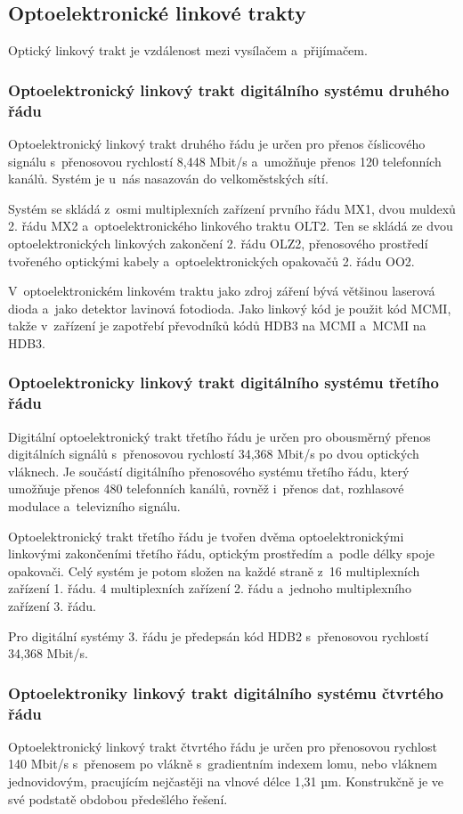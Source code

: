 \subsection{Optoelektronické linkové trakty}
Optický linkový trakt je vzdálenost mezi vysílačem a~přijímačem.

\subsubsection{Optoelektronický linkový trakt digitálního systému druhého řádu}
Optoelektronický linkový trakt druhého řádu je určen pro přenos číslicového signálu s~přenosovou rychlostí 8,448 Mbit/s a~umožňuje přenos 120 telefonních kanálů. Systém je u~nás nasazován do velkoměstských sítí.

Systém se skládá z~osmi multiplexních zařízení prvního řádu MX1, dvou muldexů 2. řádu MX2 a~optoelektronického linkového traktu OLT2. Ten se skládá ze dvou optoelektronických linkových zakončení 2. řádu OLZ2, přenosového prostředí tvořeného optickými kabely a~optoelektronických opakovačů 2. řádu OO2.

V~optoelektronickém linkovém traktu jako zdroj záření bývá většinou laserová dioda a~jako detektor lavinová fotodioda. Jako linkový kód je použit kód MCMI, takže v~zařízení je zapotřebí převodníků kódů HDB3 na MCMI a~MCMI na HDB3.

\subsubsection{Optoelektronicky linkový trakt digitálního systému třetího řádu}
Digitální optoelektronický trakt třetího řádu je určen pro obousměrný přenos digitálních signálů s~přenosovou rychlostí 34,368 Mbit/s po dvou optických vláknech. Je součástí digitálního přenosového systému třetího řádu, který umožňuje přenos 480 telefonních kanálů, rovněž i~přenos dat, rozhlasové modulace a~televizního signálu.

Optoelektronický trakt třetího řádu je tvořen dvěma optoelektronickými linkovými zakončeními třetího řádu, optickým prostředím a~podle délky spoje opakovači. Celý systém je potom složen na každé straně z~16 multiplexních zařízení 1. řádu. 4 multiplexních zařízení 2. řádu a~jednoho multiplexního zařízení 3. řádu.

Pro digitální systémy 3. řádu je předepsán kód HDB2 s~přenosovou rychlostí 34,368 Mbit/s.

\subsubsection{Optoelektroniky linkový trakt digitálního systému čtvrtého řádu}
Optoelektronický linkový trakt čtvrtého řádu je určen pro přenosovou rychlost 140 Mbit/s s~přenosem po vlákně s~gradientním indexem lomu, nebo vláknem jednovidovým, pracujícím nejčastěji na vlnové délce 1,31 µm. Konstrukčně je ve své podstatě obdobou předešlého řešení.

